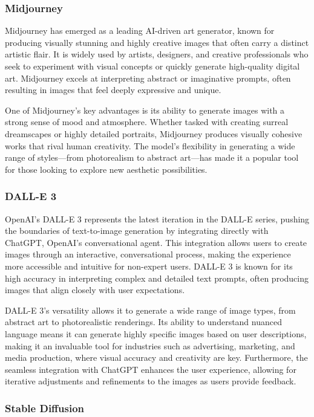 \subsubsection{Midjourney}

Midjourney has emerged as a leading AI-driven art generator, known for producing visually stunning and highly creative images that often carry a distinct artistic flair. It is widely used by artists, designers, and creative professionals who seek to experiment with visual concepts or quickly generate high-quality digital art. Midjourney excels at interpreting abstract or imaginative prompts, often resulting in images that feel deeply expressive and unique.

One of Midjourney's key advantages is its ability to generate images with a strong sense of mood and atmosphere. Whether tasked with creating surreal dreamscapes or highly detailed portraits, Midjourney produces visually cohesive works that rival human creativity. The model's flexibility in generating a wide range of styles—from photorealism to abstract art—has made it a popular tool for those looking to explore new aesthetic possibilities.

\subsubsection{DALL-E 3}

OpenAI's DALL-E 3 represents the latest iteration in the DALL-E series, pushing the boundaries of text-to-image generation by integrating directly with ChatGPT, OpenAI's conversational agent. This integration allows users to create images through an interactive, conversational process, making the experience more accessible and intuitive for non-expert users. DALL-E 3 is known for its high accuracy in interpreting complex and detailed text prompts, often producing images that align closely with user expectations.

DALL-E 3's versatility allows it to generate a wide range of image types, from abstract art to photorealistic renderings. Its ability to understand nuanced language means it can generate highly specific images based on user descriptions, making it an invaluable tool for industries such as advertising, marketing, and media production, where visual accuracy and creativity are key. Furthermore, the seamless integration with ChatGPT enhances the user experience, allowing for iterative adjustments and refinements to the images as users provide feedback.

\subsubsection{Stable Diffusion}

